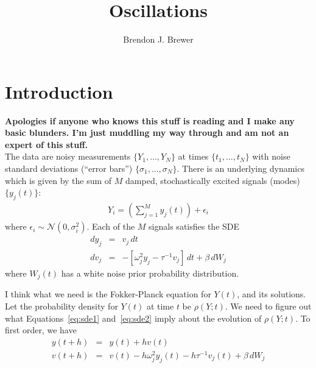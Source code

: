 \documentclass[letterpaper, 11pt]{article}
\title{Oscillations}
\author{Brendon J. Brewer}
\begin{document}
\maketitle

\section{Introduction}
{\bf Apologies if anyone who knows this stuff is reading and I make any basic
blunders. I'm just muddling my way through and am not an expert of this stuff.}\\

The data are noisy measurements $\{Y_1, ..., Y_N\}$ at times
$\{t_1, ..., t_N\}$ with noise standard deviations (``error bars'')
$\{\sigma_1, ..., \sigma_N\}$. There is an underlying dynamics which is
given by the sum of $M$ damped, stochastically excited signals (modes)
$\{y_j(t)\}$:
\begin{eqnarray}
Y_i = \left(\sum_{j=1}^M y_j(t)\right) + \epsilon_i
\end{eqnarray}
where $\epsilon_i \sim \mathcal{N}(0, \sigma_i^2)$.
Each of the $M$ signals satisfies the SDE
\begin{eqnarray}
dy_j &=& v_j \,dt\label{eq:sde1}\\
dv_j &=& -\left[\omega_j^2y_j - \tau^{-1}v_j\right] \,dt + \beta \,dW_j\label{eq:sde2}
\end{eqnarray}
where $W_j(t)$ has a white noise prior probability distribution.

I think what we need is the Fokker-Planck equation for $Y(t)$, and its
solutions. Let the probability density for $Y(t)$ at time $t$ be
$\rho(Y; t)$. We need to figure out what Equations~\ref{eq:sde1}
and~\ref{eq:sde2} imply about the evolution of $\rho(Y; t)$.
To first order, we have
\begin{eqnarray}
y(t + h) &=& y(t) + h v(t)\\
v(t + h) &=& v(t) - h\omega_j^2y_j(t) - h\tau^{-1}v_j(t) + \beta \,dW_j
\end{eqnarray}
\end{document}
